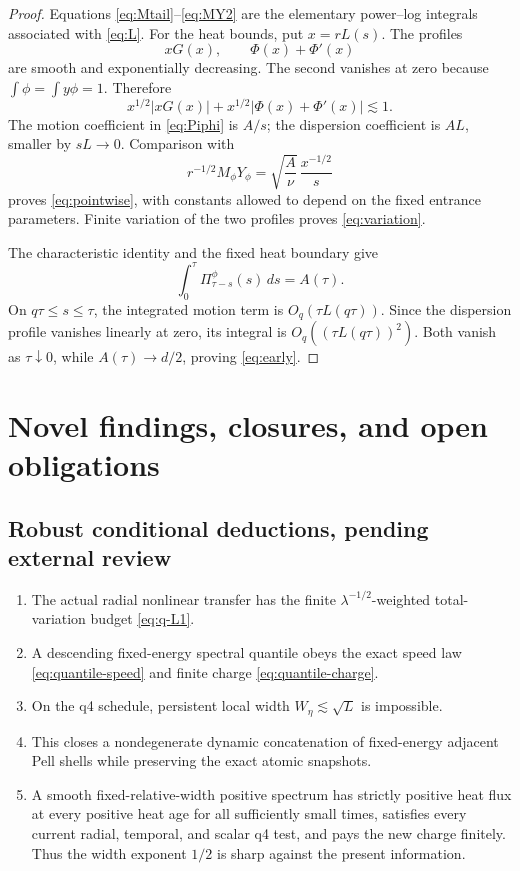 \documentclass[11pt]{article}
\theoremstyle{remark}
\begin{document}
\begin{proof}
Equations \eqref{eq:Mtail}--\eqref{eq:MY2} are the elementary
power--log integrals associated with \eqref{eq:L}.  For the heat bounds,
put \(x=rL(s)\).  The profiles
\[
 xG(x),
 \qquad
 \Phi(x)+\Phi'(x)
\]
are smooth and exponentially decreasing.  The second vanishes at zero
because \(\int\phi=\int y\phi=1\).  Therefore
\[
 x^{1/2}|xG(x)|
 +x^{1/2}|\Phi(x)+\Phi'(x)|\lesssim1.
\]
The motion coefficient in \eqref{eq:Piphi} is \(A/s\); the dispersion
coefficient is \(AL\), smaller by \(sL\to0\).  Comparison with
\[
 r^{-1/2}M_\phi Y_\phi
 =
 \sqrt{\frac A\nu}\,\frac{x^{-1/2}}s
\]
proves \eqref{eq:pointwise}, with constants allowed to depend on the
fixed entrance parameters.  Finite variation of the two profiles proves
\eqref{eq:variation}.

The characteristic identity and the fixed heat boundary give
\[
 \int_0^\tau\Pi^\phi_{\tau-s}(s)\,ds=A(\tau).
\]
On \(q\tau\le s\le\tau\), the integrated motion term is
\(O_q(\tau L(q\tau))\).  Since the dispersion profile vanishes linearly
at zero, its integral is
\(O_q((\tau L(q\tau))^2)\).  Both vanish as \(\tau\downarrow0\), while
\(A(\tau)\to d/2\), proving \eqref{eq:early}.
\end{proof}

\section{Novel findings, closures, and open obligations}

\subsection*{Robust conditional deductions, pending external review}

\begin{enumerate}
 \item The actual radial nonlinear transfer has the finite
 \(\lambda^{-1/2}\)-weighted total-variation budget
 \eqref{eq:q-L1}.
 \item A descending fixed-energy spectral quantile obeys the exact
 speed law \eqref{eq:quantile-speed} and finite charge
 \eqref{eq:quantile-charge}.
 \item On the q4 schedule, persistent local width
 \(W_\eta\lesssim\sqrt L\) is impossible.
 \item This closes a nondegenerate dynamic concatenation of fixed-energy
 adjacent Pell shells while preserving the exact atomic snapshots.
 \item A smooth fixed-relative-width positive spectrum has strictly
 positive heat flux at every positive heat age for all sufficiently
 small times, satisfies every current radial, temporal, and scalar q4
 test, and pays the new charge finitely.  Thus the width exponent
 \(1/2\) is sharp against the present information.
\end{enumerate}
\end{document}
